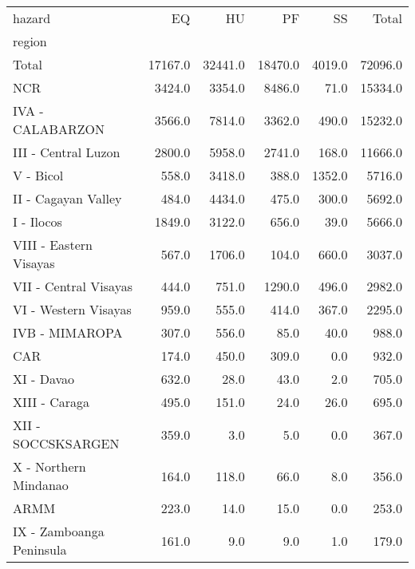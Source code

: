 \begin{tabular}{lrrrrr}
\toprule
hazard &       EQ &       HU &       PF &      SS &    Total \\
region                   &          &          &          &         &          \\
\midrule
Total                    &  17167.0 &  32441.0 &  18470.0 &  4019.0 &  72096.0 \\
NCR                      &   3424.0 &   3354.0 &   8486.0 &    71.0 &  15334.0 \\
IVA - CALABARZON         &   3566.0 &   7814.0 &   3362.0 &   490.0 &  15232.0 \\
III - Central Luzon      &   2800.0 &   5958.0 &   2741.0 &   168.0 &  11666.0 \\
V - Bicol                &    558.0 &   3418.0 &    388.0 &  1352.0 &   5716.0 \\
II - Cagayan Valley      &    484.0 &   4434.0 &    475.0 &   300.0 &   5692.0 \\
I - Ilocos               &   1849.0 &   3122.0 &    656.0 &    39.0 &   5666.0 \\
VIII - Eastern Visayas   &    567.0 &   1706.0 &    104.0 &   660.0 &   3037.0 \\
VII - Central Visayas    &    444.0 &    751.0 &   1290.0 &   496.0 &   2982.0 \\
VI - Western Visayas     &    959.0 &    555.0 &    414.0 &   367.0 &   2295.0 \\
IVB - MIMAROPA           &    307.0 &    556.0 &     85.0 &    40.0 &    988.0 \\
CAR                      &    174.0 &    450.0 &    309.0 &     0.0 &    932.0 \\
XI - Davao               &    632.0 &     28.0 &     43.0 &     2.0 &    705.0 \\
XIII - Caraga            &    495.0 &    151.0 &     24.0 &    26.0 &    695.0 \\
XII - SOCCSKSARGEN       &    359.0 &      3.0 &      5.0 &     0.0 &    367.0 \\
X - Northern Mindanao    &    164.0 &    118.0 &     66.0 &     8.0 &    356.0 \\
ARMM                     &    223.0 &     14.0 &     15.0 &     0.0 &    253.0 \\
IX - Zamboanga Peninsula &    161.0 &      9.0 &      9.0 &     1.0 &    179.0 \\
\bottomrule
\end{tabular}
